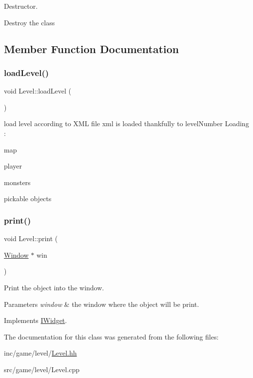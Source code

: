 Destructor. 

Destroy the class 

\subsection{Member Function Documentation}
\mbox{\label{classLevel_aa88db36cd824320cb599d913603dc2a3}} 
\subsubsection{\texorpdfstring{load\+Level()}{loadLevel()}}
{\footnotesize\ttfamily void Level\+::load\+Level (\begin{DoxyParamCaption}{ }\end{DoxyParamCaption})}

load level according to X\+ML file xml is loaded thankfully to level\+Number Loading \+:
\begin{DoxyItemize}
\item map
\item player
\item monsters
\item pickable objects 
\end{DoxyItemize}\mbox{\label{classLevel_ab8311fe64b7957d627053359331b0b6b}} 
\subsubsection{\texorpdfstring{print()}{print()}}
{\footnotesize\ttfamily void Level\+::print (\begin{DoxyParamCaption}\item[{\hyperlink{classWindow}{Window} $\ast$}]{win }\end{DoxyParamCaption})\hspace{0.3cm}{\ttfamily [virtual]}}



Print the object into the window. 


\begin{DoxyParams}{Parameters}
{\em \textquotesingle{}window\textquotesingle{}} & the window where the object will be print. \\
\hline
\end{DoxyParams}


Implements \hyperlink{classIWidget_a0cfa49a402e9bb31808a715e048ab2f4}{I\+Widget}.



The documentation for this class was generated from the following files\+:\begin{DoxyCompactItemize}
\item 
inc/game/level/\hyperlink{Level_8hh}{Level.\+hh}\item 
src/game/level/Level.\+cpp\end{DoxyCompactItemize}
